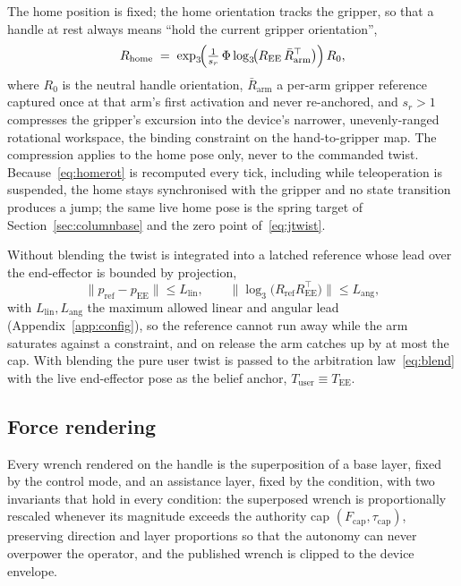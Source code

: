 \documentclass[12pt,a4paper,twoside,openright]{report}
\begin{document}
The home position is fixed; the home orientation tracks the gripper, so that a handle at rest always means ``hold the current gripper orientation'',
\begin{equation}
R_{\text{home}} \;=\; \exp_3\!\Bigl(\tfrac{1}{s_r}\,\Phi \log_3\!\bigl(R_{\text{EE}}\,\bar{R}_{\text{arm}}^{\top}\bigr)\Bigr)\, R_0,
\label{eq:homerot}
\end{equation}
where $R_0$ is the neutral handle orientation, $\bar{R}_{\text{arm}}$ a per-arm gripper reference captured once at that arm's first activation and never re-anchored, and $s_r > 1$ compresses the gripper's excursion into the device's narrower, unevenly-ranged rotational workspace, the binding constraint on the hand-to-gripper map. The compression applies to the home pose only, never to the commanded twist. Because~\eqref{eq:homerot} is recomputed every tick, including while teleoperation is suspended, the home stays synchronised with the gripper and no state transition produces a jump; the same live home pose is the spring target of Section~\ref{sec:columnbase} and the zero point of~\eqref{eq:jtwist}.

Without blending the twist is integrated into a latched reference whose lead over the end-effector is bounded by projection,
\begin{equation}
\|p_{\text{ref}} - p_{\text{EE}}\| \le L_{\text{lin}},
\qquad
\bigl\|\log_3\!\bigl(R_{\text{ref}} R_{\text{EE}}^{\top}\bigr)\bigr\| \le L_{\text{ang}},
\label{eq:latchlead}
\end{equation}
with $L_{\text{lin}}, L_{\text{ang}}$ the maximum allowed linear and angular lead (Appendix~\ref{app:config}), so the reference cannot run away while the arm saturates against a constraint, and on release the arm catches up by at most the cap. With blending the pure user twist is passed to the arbitration law~\eqref{eq:blend} with the live end-effector pose as the belief anchor, $T_{\text{user}} \equiv T_{\text{EE}}$.

\subsection{Force rendering}
\label{sec:rendering}

Every wrench rendered on the handle is the superposition of a base layer, fixed by the control mode, and an assistance layer, fixed by the condition, with two invariants that hold in every condition: the superposed wrench is proportionally rescaled whenever its magnitude exceeds the authority cap $(F_{\text{cap}}, \tau_{\text{cap}})$, preserving direction and layer proportions so that the autonomy can never overpower the operator, and the published wrench is clipped to the device envelope.
\end{document}
